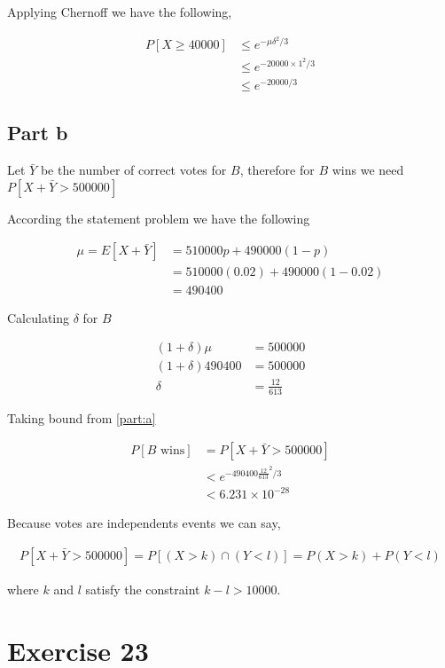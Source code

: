 \documentclass[12pt, a4paper]{article}
\begin{document}
Applying Chernoff we have the following,

\begin{align*}
	P[X \geq 40000] &\leq e^{-\mu \delta^2/3}\\
                  &\leq e^{-20000 \times 1^2/3}\\
                  &\leq e^{-20000/3}
\end{align*}

\subsection{Part b}

Let $\bar Y$ be the number of correct votes for $B$, therefore for $B$ wins we
need $P[X + \bar Y > 500000]$

According the statement problem we have the following

\begin{align*}
  \mu = E[X + \bar Y] &= 510000p + 490000(1-p) \\
                      &= 510000(0.02) + 490000(1-0.02) \\
                      &= 490400
\end{align*}

Calculating $\delta$ for $B$

\begin{align*}
  (1 + \delta)\mu &= 500000\\
  (1 + \delta)490400 &= 500000\\
  \delta &= \frac{12}{613}
\end{align*}

Taking bound from \ref{part:a}

\begin{align*}
  P[B \text{ wins}] &= P[X + \bar Y > 500000]\\
                   &< e^{-490400 \frac{12}{613}^2/3}\\
                   &< 6.231 \times 10^{-28}
\end{align*}

Because votes are independents events we can say,

\begin{align*}
  P[X + \bar Y > 500000] = P[(X > k) \cap (Y < l)] = P(X > k) + P(Y < l)
\end{align*}

where $k$ and $l$ satisfy the constraint $k-l > 10000$.

\section{Exercise 23}
\end{document}
